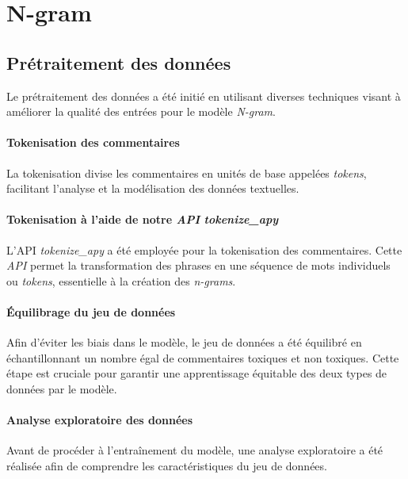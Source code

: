 \chapter{N-gram}

\section{Prétraitement des données}

Le prétraitement des données a été initié en utilisant diverses techniques visant à améliorer la qualité des entrées pour le modèle \textit{N-gram}.

\subsubsection{Tokenisation des commentaires}

La tokenisation divise les commentaires en unités de base appelées \textit{tokens}, facilitant l'analyse et la modélisation des données textuelles.

\subsubsection*{Tokenisation à l'aide de notre \textit{API} \textit{tokenize\_apy}}

L'API \textit{tokenize\_apy} a été employée pour la tokenisation des commentaires. Cette \textit{API} permet la transformation des phrases en une séquence de mots individuels ou \textit{tokens}, essentielle à la création des \textit{n-grams}.

\subsubsection*{Équilibrage du jeu de données}

Afin d'éviter les biais dans le modèle, le jeu de données a été équilibré en échantillonnant un nombre égal de commentaires toxiques et non toxiques. Cette étape est cruciale pour garantir une apprentissage équitable des deux types de données par le modèle.

\subsubsection{Analyse exploratoire des données}

Avant de procéder à l'entraînement du modèle, une analyse exploratoire a été réalisée afin de comprendre les caractéristiques du jeu de données.

